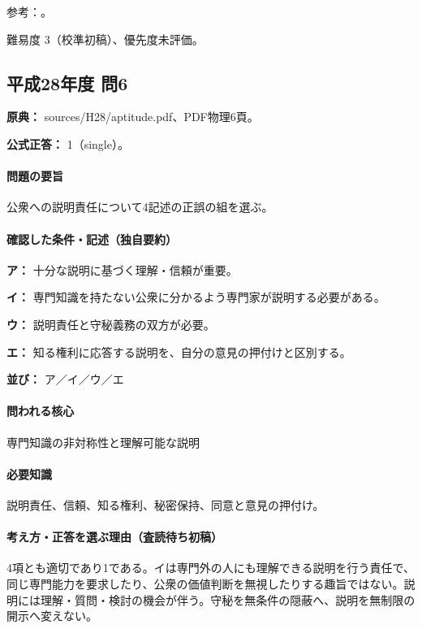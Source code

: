 \par 参考：\cite{mlit_mediation2006,mlit_pi_thirdparty}。

\par 難易度 3（校準初稿）、優先度未評価。

\subsection{平成28年度 問6}
\label{q:h28-reg-apt-06}

\noindent\textbf{原典：} sources/H28/aptitude.pdf、PDF物理6頁。

\textbf{公式正答：} 1（single）。

\paragraph{問題の要旨} 公衆への説明責任について4記述の正誤の組を選ぶ。

\paragraph{確認した条件・記述（独自要約）}\mbox{}\par

\noindent\textbf{ア：} 十分な説明に基づく理解・信頼が重要。\par

\noindent\textbf{イ：} 専門知識を持たない公衆に分かるよう専門家が説明する必要がある。\par

\noindent\textbf{ウ：} 説明責任と守秘義務の双方が必要。\par

\noindent\textbf{エ：} 知る権利に応答する説明を、自分の意見の押付けと区別する。\par

\noindent\textbf{並び：} ア／イ／ウ／エ\par

\paragraph{問われる核心} 専門知識の非対称性と理解可能な説明

\paragraph{必要知識} 説明責任、信頼、知る権利、秘密保持、同意と意見の押付け。

\paragraph{考え方・正答を選ぶ理由（査読待ち初稿）} 4項とも適切であり1である。イは専門外の人にも理解できる説明を行う責任で、同じ専門能力を要求したり、公衆の価値判断を無視したりする趣旨ではない。説明には理解・質問・検討の機会が伴う。守秘を無条件の隠蔽へ、説明を無制限の開示へ変えない。

